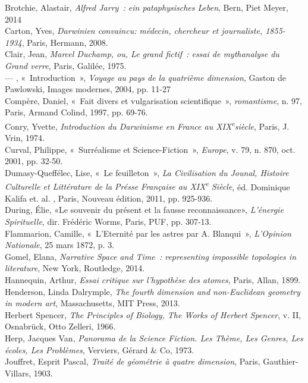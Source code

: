 Brotchie, Alastair, \emph{Alfred Jarry~: ein pataphysisches Leben}, Bern, Piet Meyer, 2014\\
Carton, Yves, \emph{Darwinien convaincu: médecin, chercheur et journaliste, 1855-1934}, Paris, Hermann, 2008.\\
Clair, Jean, \emph{Marcel Duchamp, ou, Le grand fictif~: essai de mythanalyse du Grand verre}, Paris, Galilée, 1975.\\
--- , «~Introduction~», \emph{Voyage au pays de la quatrième dimension}, Gaston de Pawlowski, Images modernes, 2004, pp. 11-27\\
Compère, Daniel, «~Fait divers et vulgarisation scientifique~», \emph{romantisme}, n. 97, Paris, Armand Colind, 1997, pp. 69-76.\\
Conry, Yvette, \emph{Introduction du Darwinisme en France au XIX\textsuperscript{e}siècle}, Paris, J. Vrin, 1974.\\
Curval, Philippe, «~Surréalisme et Science-Fiction~», \emph{Europe}, v. 79, n. 870, oct. 2001, pp. 32-50.\\
Dumasy-Queffélec, Lise, «~Le feuilleton~», \emph{La Civilisation du Jounal, Histoire Culturelle et Littérature de la Présse Française au XIX\textsuperscript{e} Siècle}, éd. Dominique Kalifa et. al. , Paris, Nouveau édition, 2011, pp. 925-936.\\
During, Élie, «Le souvenir du présent et la fausse reconnaissance», \emph{L'énergie Spirituelle}, dir. Frédéric Worms, Paris, PUF, pp. 307-13.\\
Flammarion, Camille, «~L'Eternité par les astres par A. Blanqui~», \emph{L'Opinion Nationale}, 25 mars 1872, p. 3.\\
Gomel, Elana, \emph{Narrative Space and Time~: representing impossible topologies in literature}, New York, Routledge, 2014.\\
Hannequin, Arthur, \emph{Essai critique sur l'hypothèse des atomes}, Paris, Allan, 1899.\\
Henderson, Linda Dalrymple, \emph{The fourth dimension and non-Euclidean geometry in modern art}, Massachusetts, MIT Press, 2013.\\
Herbert Spencer, \emph{The Principles of Biology, The Works of Herbert Spencer}, v. II, Osnabrück, Otto Zelleri, 1966.\\
Herp, Jacques Van, \emph{Panorama de la Science Fiction. Les Thème, Les Genres, Les écoles, Les Problèmes}, Verviers, Gérard \& Co, 1973.\\
Jouffret, Esprit Pascal, \emph{Traité de géométrie à quatre dimension}, Paris, Gauthier-Villars, 1903.\\
